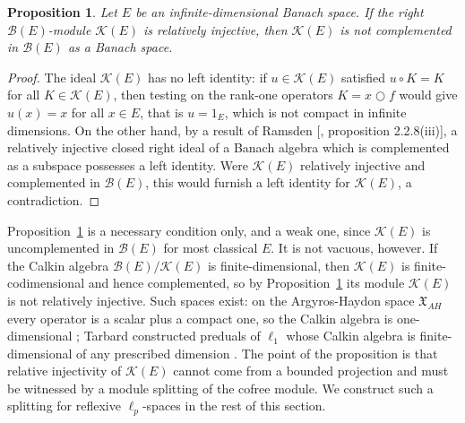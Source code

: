 \documentclass[12pt]{article}
\newtheorem{proposition}[theorem]{Proposition}
\begin{document}
\begin{proposition}\label{KNotComplemented}
    Let $E$ be an infinite-dimensional Banach space. If the right 
    $\mathcal{B}(E)$-module $\mathcal{K}(E)$ is relatively injective, then 
    $\mathcal{K}(E)$ is not complemented in $\mathcal{B}(E)$ as a Banach space.
\end{proposition}
\begin{proof} The ideal $\mathcal{K}(E)$ has no left identity: if $u\in
    \mathcal{K}(E)$ satisfied $u\circ K=K$ for all $K\in\mathcal{K}(E)$, then 
    testing on the rank-one operators $K=x\bigcirc f$ would give $u(x)=x$ for 
    all $x\in E$, that is $u=1_E$, which is not compact in infinite 
    dimensions. On the other hand, by a result of 
    Ramsden [\cite{RamsdenThesis}, proposition 2.2.8(iii)], a relatively 
    injective closed right ideal of a Banach algebra which is complemented as a 
    subspace possesses a left identity. Were $\mathcal{K}(E)$ relatively 
    injective and complemented in $\mathcal{B}(E)$, this would furnish a left 
    identity for $\mathcal{K}(E)$, a contradiction.
\end{proof}

Proposition~\ref{KNotComplemented} is a necessary condition only, and a weak 
one, since $\mathcal{K}(E)$ is uncomplemented in $\mathcal{B}(E)$ for most 
classical $E$. It is not vacuous, however. If the Calkin algebra 
$\mathcal{B}(E)/\mathcal{K}(E)$ is finite-dimensional, then $\mathcal{K}(E)$ is 
finite-codimensional and hence complemented, so by 
Proposition~\ref{KNotComplemented} its module $\mathcal{K}(E)$ is not relatively 
injective. Such spaces exist: on the Argyros-Haydon space $\mathfrak{X}_{AH}$ 
every operator is a scalar plus a compact one, so the Calkin algebra is 
one-dimensional \cite{ArgyrosHaydon}; Tarbard constructed preduals of $\ell_1$ 
whose Calkin algebra is finite-dimensional of any prescribed dimension 
\cite{Tarbard}. The point of the proposition is that 
relative injectivity of $\mathcal{K}(E)$ cannot come from a bounded projection 
and must be witnessed by a module splitting of the cofree module. We construct 
such a splitting for reflexive $\ell_p$-spaces in the rest of this section.
\end{document}
